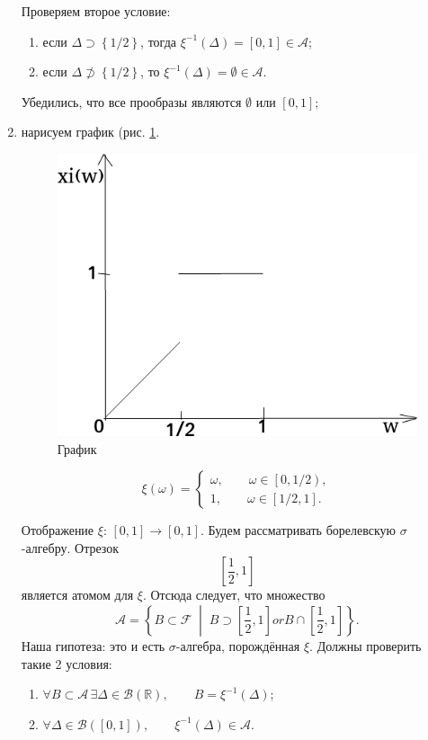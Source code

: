 \begin{enumerate}[label=\alph*)]
Проверяем второе условие:
\begin{enumerate}[label=\alph*)]
\item если $ \Delta \supset \left\{ 1/2 \right\} $, тогда $ \xi^{-1} \left( \Delta \right) = \left[ 0, 1 \right] \in \mathcal{A} $;
\item если $ \Delta \not\supset \left\{ 1/2 \right\} $, то $ \xi^{-1} \left( \Delta \right) = \emptyset \in \mathcal{A} $.
\end{enumerate}

Убедились, что все прообразы являются $ \emptyset $ или $ \left[ 0, 1 \right] $;
\item нарисуем график (рис. \ref{fig:881}.

\begin{figure}[h!]
  \centering
  \includegraphics[width=.4\textwidth]{./pictures/8_81.png}
  \caption{График}
  \label{fig:881}
\end{figure}

$$ \xi \left( \omega \right) =
\begin{cases}
\omega, \qquad \omega \in \left[ 0, 1/2 \right), \\
1, \qquad \omega \in \left[ 1/2, 1 \right].
\end{cases} $$

Отображение $ \xi: \, \left[ 0, 1 \right] \rightarrow \left[ 0, 1 \right] $.
Будем рассматривать борелевскую $ \sigma $-алгебру.
Отрезок
$$ \left[ \frac{1}{2}, 1 \right] $$
является атомом для $ \xi $.
Отсюда следует, что множество
$$ \mathcal{A} =
\left\{ B \subset \mathcal{F} \; \middle| \; B \supset \left[ \frac{1}{2}, 1 \right] or B \cap \left[ \frac{1}{2}, 1 \right] \right\}.$$
Наша гипотеза: это и есть $ \sigma $-алгебра, порождённая $ \xi $.
Должны проверить такие 2 условия:
\begin{enumerate}
\item $ \forall B \subset \mathcal{A} \, \exists \Delta \in \mathcal{B} \left( \mathbb{R} \right), \qquad B = \xi^{-1} \left( \Delta \right) $;
\item $ \forall \Delta \in \mathcal{B} \left( \left[ 0, 1 \right] \right), \qquad \xi^{-1} \left( \Delta \right) \in \mathcal{A} $.
\end{enumerate}


\end{enumerate}
